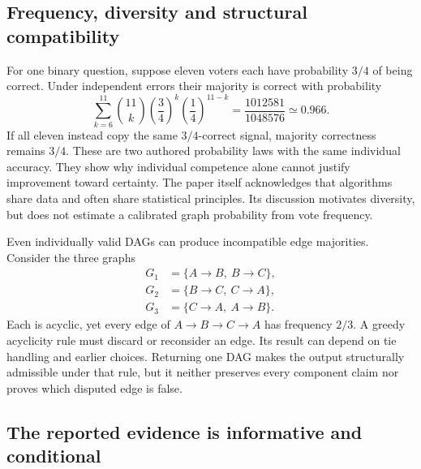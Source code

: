 \subsection{Frequency, diversity and structural compatibility}
\label{exec20:expert-votes}

For one binary question, suppose eleven voters each have probability $3/4$ of
being correct. Under independent errors their majority is correct with
probability
\begin{equation}
 \sum_{k=6}^{11}\binom{11}{k}
       \left(\frac34\right)^k\left(\frac14\right)^{11-k}
 =\frac{1012581}{1048576}\simeq0.966.
 \label{exec20:expert-majority}
\end{equation}
If all eleven instead copy the same $3/4$-correct signal, majority correctness
remains $3/4$. These are two authored probability laws with the same individual
accuracy. They show why individual competence alone cannot justify improvement
toward certainty. The paper itself acknowledges that algorithms share data and
often share statistical principles. Its discussion motivates diversity, but
does not estimate a calibrated graph probability from vote frequency.
\citep{exec20_expert_averaging,exec20_expert_averaging_reference}

Even individually valid DAGs can produce incompatible edge majorities. Consider
the three graphs
\begin{equation}
 \begin{split}
 G_1&=\{A\rightarrow B,\ B\rightarrow C\},\\
 G_2&=\{B\rightarrow C,\ C\rightarrow A\},\\
 G_3&=\{C\rightarrow A,\ A\rightarrow B\}.
 \end{split}
 \label{exec20:expert-cycle}
\end{equation}
Each is acyclic, yet every edge of $A\rightarrow B\rightarrow C\rightarrow A$
has frequency $2/3$. A greedy acyclicity rule must discard or reconsider an
edge. Its result can depend on tie handling and earlier choices. Returning one
DAG makes the output structurally admissible under that rule, but it neither
preserves every component claim nor proves which disputed edge is false.
\citep{exec20_expert_averaging_reference}

\subsection{The reported evidence is informative and conditional}
\label{exec20:expert-evidence}

